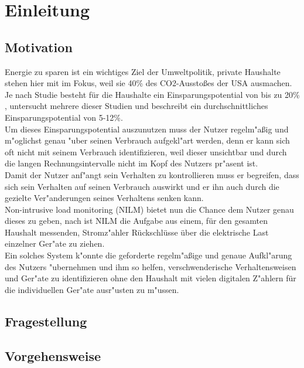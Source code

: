 \section{Einleitung}
\label{Einleitung}

\subsection{Motivation}
\label{Motivation}

Energie zu sparen ist ein wichtiges Ziel der Umweltpolitik, private Haushalte stehen hier mit im Fokus, weil sie  40\% des CO2-Aussto{\ss}es \cite{vandenbergh2008individual} der USA ausmachen. \\
Je nach Studie besteht für die Haushalte ein Einsparungspotential von bis zu 20\% \cite{armel2013disaggregation}, \cite{fischer2008feedback} untersucht mehrere dieser Studien und beschreibt ein durchschnittliches Einsparungspotential von 5-12\%.\\
Um dieses Einsparungspotential auszunutzen muss der Nutzer regelm"a{\ss}ig und m"oglichst genau "uber seinen Verbrauch aufgekl"art werden, %
denn er kann sich oft nicht mit seinem Verbrauch identifizieren, weil dieser unsichtbar und durch die langen Rechnungsintervalle nicht im Kopf des Nutzers pr"asent ist. \\
Damit der Nutzer anf"angt sein Verhalten zu kontrollieren muss er begreifen, dass sich sein Verhalten auf seinen Verbrauch auswirkt und er ihn auch durch die gezielte Ver"anderungen seines Verhaltens senken kann.\cite{fischer2008feedback}\\
Non-intrusive load monitoring (NILM) bietet nun die Chance dem Nutzer genau dieses zu geben, nach \cite{kolter2011redd} ist NILM die Aufgabe aus einem, für den gesamten Haushalt messenden, Stromz"ahler Rückschlüsse über die elektrische Last einzelner Ger"ate zu ziehen. \\
Ein solches System k"onnte die geforderte regelm"a{\ss}ige und genaue Aufkl"arung des Nutzers "ubernehmen und ihm so helfen, verschwenderische Verhaltensweisen und Ger"ate zu identifizieren ohne den Haushalt mit vielen digitalen Z"ahlern für die individuellen Ger"ate ausr"usten zu m"ussen.

\subsection{Fragestellung}
\label{Fragestellung}


\subsection{Vorgehensweise}
\label{Vorgehensweise}
